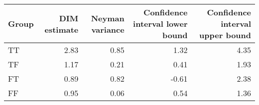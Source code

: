 \begin{tabular}{lrrrr}
  \hline
Group & DIM estimate & Neyman variance & Confidence interval lower bound & Confidence interval upper bound \\ 
  \hline
TT & 2.83 & 0.85 & 1.32 & 4.35 \\ 
  TF & 1.17 & 0.21 & 0.41 & 1.93 \\ 
  FT & 0.89 & 0.82 & -0.61 & 2.38 \\ 
  FF & 0.95 & 0.06 & 0.54 & 1.36 \\ 
   \hline
\end{tabular}
